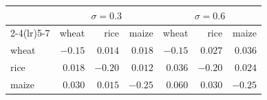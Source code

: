\begin{tabular}{l rrr rrr}
\toprule
 & \multicolumn{3}{c}{\(\sigma=0.3\)} & \multicolumn{3}{c}{\(\sigma=0.6\)} \\
\cmidrule(lr){2-4}\cmidrule(lr){5-7}
 & wheat & rice & maize & wheat & rice & maize \\
\midrule
wheat & $-0.15$ & $0.014$ & $0.018$ & $-0.15$ & $0.027$ & $0.036$ \\
rice  & $0.018$ & $-0.20$ & $0.012$ & $0.036$ & $-0.20$ & $0.024$ \\
maize & $0.030$ & $0.015$ & $-0.25$ & $0.060$ & $0.030$ & $-0.25$ \\
\bottomrule
\end{tabular}
